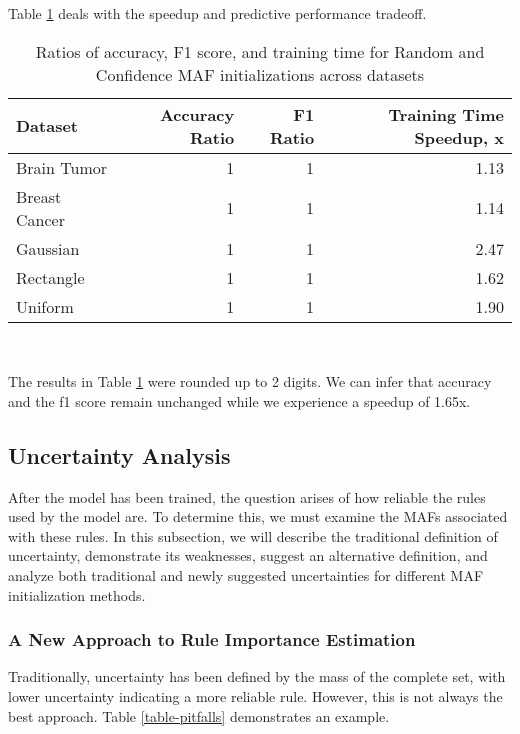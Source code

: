 \documentclass[10pt,a4paper,oneside]{article}
\begin{document}
\newpage
Table \ref{table-ratios} deals with the speedup and predictive performance tradeoff. \\

\begin{table}[htbp]
    \centering
    \caption{Ratios of accuracy, F1 score, and training time for Random and Confidence MAF initializations across datasets}
    \label{table-ratios}
    \begin{tabular}{l|r|r|r}
    \toprule
    Dataset & Accuracy Ratio & F1 Ratio & Training Time Speedup, x \\
    \midrule
Brain Tumor & 1 & 1 & 1.13 \\
Breast Cancer & 1 & 1 & 1.14 \\
Gaussian & 1 & 1 & 2.47 \\
Rectangle & 1 & 1 & 1.62 \\
Uniform & 1 & 1 & 1.90 \\
    \bottomrule
    \end{tabular} \\
\end{table}

The results in Table \ref{table-ratios} were rounded up to 2 digits. We can infer that accuracy and the f1 score remain unchanged while we experience a speedup of 1.65x.


\subsection{Uncertainty Analysis}\label{sec:uncertainty-analysis}
After the model has been trained, the question arises of how reliable the rules used by the model are. To determine this, we must examine the MAFs associated with these rules. In this subsection, we will describe the traditional definition of uncertainty, demonstrate its weaknesses, suggest an alternative definition, and analyze both traditional and newly suggested uncertainties for different MAF initialization methods.

\subsubsection{A New Approach to Rule Importance Estimation}
Traditionally, uncertainty has been defined by the mass of the complete set, with lower uncertainty indicating a more reliable rule. However, this is not always the best approach. Table \ref{table-pitfalls} demonstrates an example. 
\end{document}
